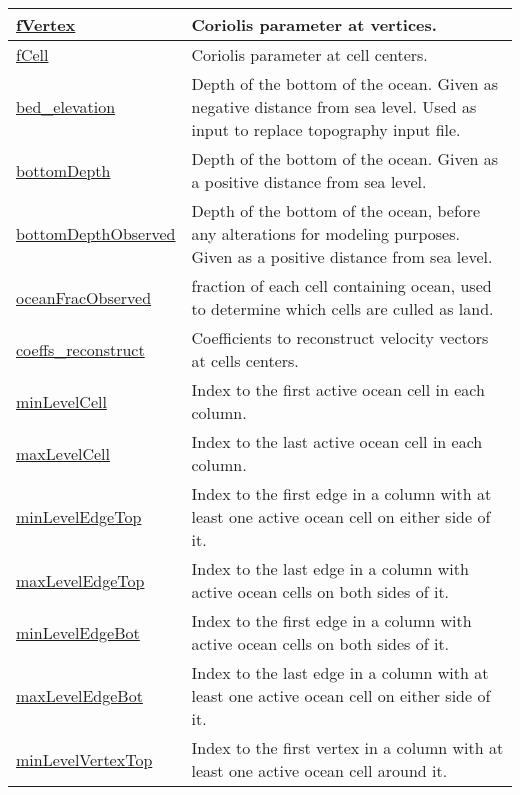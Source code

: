 {\begin{center}
\begin{longtable}{| p{2.0in} | p{4.0in} |}
    \hline
    \hyperref[subsec:var_sec_mesh_fVertex]{fVertex} & Coriolis parameter at vertices. \\
    \hline
    \hyperref[subsec:var_sec_mesh_fCell]{fCell} & Coriolis parameter at cell centers. \\
    \hline
    \hyperref[subsec:var_sec_mesh_bed_elevation]{bed\_elevation} & Depth of the bottom of the ocean. Given as negative distance from sea level. Used as input to replace topography input file. \\
    \hline
    \hyperref[subsec:var_sec_mesh_bottomDepth]{bottomDepth} & Depth of the bottom of the ocean. Given as a positive distance from sea level. \\
    \hline
    \hyperref[subsec:var_sec_mesh_bottomDepthObserved]{bottomDepthObserved} & Depth of the bottom of the ocean, before any alterations for modeling purposes. Given as a positive distance from sea level. \\
    \hline
    \hyperref[subsec:var_sec_mesh_oceanFracObserved]{oceanFracObserved} & fraction of each cell containing ocean, used to determine which cells are culled as land. \\
    \hline
    \hyperref[subsec:var_sec_mesh_coeffs_reconstruct]{coeffs\_reconstruct} & Coefficients to reconstruct velocity vectors at cells centers. \\
    \hline
    \hyperref[subsec:var_sec_mesh_minLevelCell]{minLevelCell} & Index to the first active ocean cell in each column. \\
    \hline
    \hyperref[subsec:var_sec_mesh_maxLevelCell]{maxLevelCell} & Index to the last active ocean cell in each column. \\
    \hline
    \hyperref[subsec:var_sec_mesh_minLevelEdgeTop]{minLevelEdgeTop} & Index to the first edge in a column with at least one active ocean cell on either side of it. \\
    \hline
    \hyperref[subsec:var_sec_mesh_maxLevelEdgeTop]{maxLevelEdgeTop} & Index to the last edge in a column with active ocean cells on both sides of it. \\
    \hline
    \hyperref[subsec:var_sec_mesh_minLevelEdgeBot]{minLevelEdgeBot} & Index to the first edge in a column with active ocean cells on both sides of it. \\
    \hline
    \hyperref[subsec:var_sec_mesh_maxLevelEdgeBot]{maxLevelEdgeBot} & Index to the last edge in a column with at least one active ocean cell on either side of it. \\
    \hline
    \hyperref[subsec:var_sec_mesh_minLevelVertexTop]{minLevelVertexTop} & Index to the first vertex in a column with at least one active ocean cell around it. \\

\end{longtable}
\end{center}}
